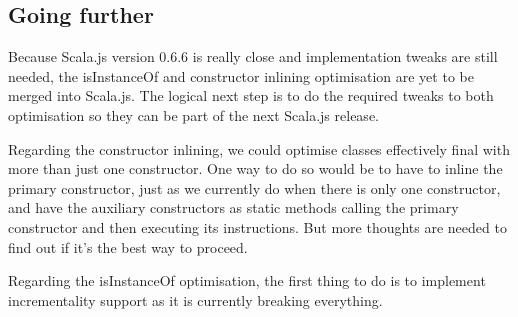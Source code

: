 \subsection{Going further}
Because Scala.js version 0.6.6 is really close and implementation
tweaks are still needed, the isInstanceOf and constructor inlining optimisation
are yet to be merged into Scala.js. The logical next step is to do the required
tweaks to both optimisation so they can be part of the next Scala.js release.

Regarding the constructor inlining, we could optimise classes effectively
final with more than just one constructor. One way to do so would be to have
to inline the primary constructor, just as we currently do when there is
only one constructor, and have the auxiliary constructors as static methods
calling the primary constructor and then executing its instructions. But more
thoughts are needed to find out if it's the best way to proceed.

Regarding the isInstanceOf optimisation, the first thing to do is to implement
incrementality support as it is currently breaking everything.